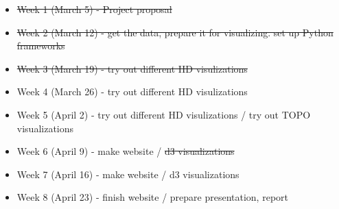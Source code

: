\documentclass{article}
\begin{document}
\begin{itemize}
\item \sout{Week 1 (March 5) - Project proposal}
\item \sout{Week 2 (March 12) - get the data, prepare it for visualizing. set up Python frameworks}
\item \sout{Week 3 (March 19) - try out different HD visulizations}
\item Week 4 (March 26) - try out different HD visulizations
\item Week 5 (April 2) - try out different HD visulizations / try out TOPO visualizations
\item Week 6 (April 9) - make website / \sout{d3 visualizations}
\item Week 7 (April 16) - make website / d3 visualizations
\item Week 8 (April 23) - finish website / prepare presentation, report
\end{itemize}
\end{document}

